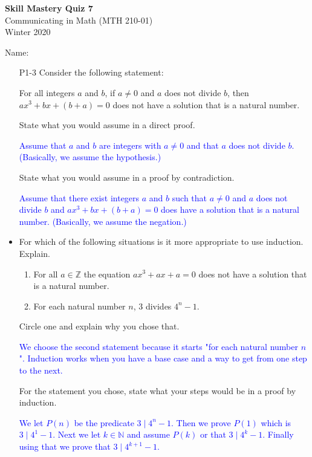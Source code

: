 \documentclass[10pt]{article}
\newcommand{\Z}{\mathbb{Z}}
\newcommand{\N}{\mathbb{N}}
\newcommand{\blue}{\textcolor{blue}}
\newcommand{\bs}{\begin{solution}}
\begin{document}
\vspace{-1.2in}
\begin{center} \textbf{\Large{Skill Mastery Quiz 7}} \\
Communicating in Math (MTH 210-01)\\
Winter 2020
\end{center}



\noindent Name: 




\begin{itemize}
	




\item[P1-3] Consider the following statement:
		\begin{center}
		For all integers $a$ and $b$, if $a\neq 0$ and $a$ does not divide $b$, then $ax^3+bx+(b+a)=0$ does not have a solution that is a natural number.
		\end{center}
	State what you would assume in a direct proof. 
	
	\bs\textcolor{blue}{Assume that $a$ and $b$ are integers with $a\neq 0$ and that $a$ does not divide $b$. (Basically, we assume the hypothesis.)}\end{solution}
	
	\vfill
	
	
	State what you would assume in a proof by contradiction.
	
	\bs\textcolor{blue}{Assume that there exist integers $a$ and $b$ such that $a\neq 0$ and $a$ does not divide $b$ and $ax^3+bx+(b+a)=0$ does have a solution that is a natural number. (Basically, we assume the negation.)}\end{solution}
\vfill

\newpage



\item [P2-1]  For which of the following situations is it more appropriate to use induction. Explain.
		\begin{enumerate}
		\item For all $a\in\Z$ the equation $ax^3+ax + a = 0$ does not have a solution that is a natural number.
		\item For each natural number $n$, $3$ divides $4^n-1$.
		\end{enumerate}
	Circle one and explain why you chose that.
	
	\bs \blue{We choose the second statement because it starts "for each natural number $n$". Induction works when you have a base case and a way to get from one step to the next.}\end{solution}
	\vspace{2in}
	
	For the statement you chose, state what your steps would be in a proof by induction.
	
	\bs \blue{ We let $P(n)$ be the predicate $3\mid 4^{n} - 1$. Then we prove $P(1)$ which is $3\mid 4^1 - 1$. Next we let $k\in\N$ and assume $P(k)$ or that $3\mid 4^k - 1$. Finally using that we prove that $3\mid 4^{k+1} -1 $.}\end{solution}
\vfill


\end{itemize}	
\end{document}
